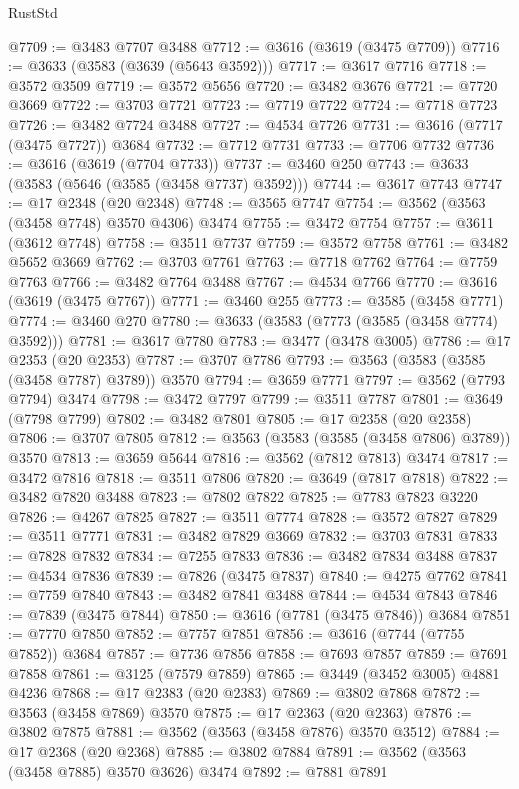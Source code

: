 \begin{lexlean}{RustStd}
\begin{coremodule}
@7709 := @3483 @7707 @3488
@7712 := @3616 (@3619 (@3475 @7709))
@7716 := @3633 (@3583 (@3639 (@5643 @3592)))
@7717 := @3617 @7716
@7718 := @3572 @3509
@7719 := @3572 @5656
@7720 := @3482 @3676
@7721 := @7720 @3669
@7722 := @3703 @7721
@7723 := @7719 @7722
@7724 := @7718 @7723
@7726 := @3482 @7724 @3488
@7727 := @4534 @7726
@7731 := @3616 (@7717 (@3475 @7727)) @3684
@7732 := @7712 @7731
@7733 := @7706 @7732
@7736 := @3616 (@3619 (@7704 @7733))
@7737 := @3460 @250
@7743 := @3633 (@3583 (@5646 (@3585 (@3458 @7737) @3592)))
@7744 := @3617 @7743
@7747 := @17 @2348 (@20 @2348)
@7748 := @3565 @7747
@7754 := @3562 (@3563 (@3458 @7748) @3570 @4306) @3474
@7755 := @3472 @7754
@7757 := @3611 (@3612 @7748)
@7758 := @3511 @7737
@7759 := @3572 @7758
@7761 := @3482 @5652 @3669
@7762 := @3703 @7761
@7763 := @7718 @7762
@7764 := @7759 @7763
@7766 := @3482 @7764 @3488
@7767 := @4534 @7766
@7770 := @3616 (@3619 (@3475 @7767))
@7771 := @3460 @255
@7773 := @3585 (@3458 @7771)
@7774 := @3460 @270
@7780 := @3633 (@3583 (@7773 (@3585 (@3458 @7774) @3592)))
@7781 := @3617 @7780
@7783 := @3477 (@3478 @3005)
@7786 := @17 @2353 (@20 @2353)
@7787 := @3707 @7786
@7793 := @3563 (@3583 (@3585 (@3458 @7787) @3789)) @3570
@7794 := @3659 @7771
@7797 := @3562 (@7793 @7794) @3474
@7798 := @3472 @7797
@7799 := @3511 @7787
@7801 := @3649 (@7798 @7799)
@7802 := @3482 @7801
@7805 := @17 @2358 (@20 @2358)
@7806 := @3707 @7805
@7812 := @3563 (@3583 (@3585 (@3458 @7806) @3789)) @3570
@7813 := @3659 @5644
@7816 := @3562 (@7812 @7813) @3474
@7817 := @3472 @7816
@7818 := @3511 @7806
@7820 := @3649 (@7817 @7818)
@7822 := @3482 @7820 @3488
@7823 := @7802 @7822
@7825 := @7783 @7823 @3220
@7826 := @4267 @7825
@7827 := @3511 @7774
@7828 := @3572 @7827
@7829 := @3511 @7771
@7831 := @3482 @7829 @3669
@7832 := @3703 @7831
@7833 := @7828 @7832
@7834 := @7255 @7833
@7836 := @3482 @7834 @3488
@7837 := @4534 @7836
@7839 := @7826 (@3475 @7837)
@7840 := @4275 @7762
@7841 := @7759 @7840
@7843 := @3482 @7841 @3488
@7844 := @4534 @7843
@7846 := @7839 (@3475 @7844)
@7850 := @3616 (@7781 (@3475 @7846)) @3684
@7851 := @7770 @7850
@7852 := @7757 @7851
@7856 := @3616 (@7744 (@7755 @7852)) @3684
@7857 := @7736 @7856
@7858 := @7693 @7857
@7859 := @7691 @7858
@7861 := @3125 (@7579 @7859)
@7865 := @3449 (@3452 @3005) @4881 @4236
@7868 := @17 @2383 (@20 @2383)
@7869 := @3802 @7868
@7872 := @3563 (@3458 @7869) @3570
@7875 := @17 @2363 (@20 @2363)
@7876 := @3802 @7875
@7881 := @3562 (@3563 (@3458 @7876) @3570 @3512)
@7884 := @17 @2368 (@20 @2368)
@7885 := @3802 @7884
@7891 := @3562 (@3563 (@3458 @7885) @3570 @3626) @3474
@7892 := @7881 @7891

\end{coremodule}
\end{lexlean}
